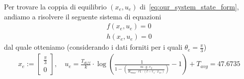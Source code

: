 \documentclass[a4paper, 11pt]{article}
\begin{document}
%
Per trovare la coppia di equilibrio $(x_e, u_e)$ di~\eqref{eq:our_system_state_form}, andiamo a risolvere il seguente sistema di equazioni
%
\begin{align}
	f(x_e,u_e) = 0  \\
	h(x_e,u_e) = 0 
\end{align}
%
dal quale otteniamo (considerando i dati forniti per i quali $\theta_e = \frac{\pi}{3}$)
%
\begin{align}
	x_e := 
        \begin{bmatrix}
	    \frac{\pi}{3} 
            \\
            0
	\end{bmatrix},  \quad u_e =  \frac{T_{diff}}{k} \cdot \log\left(\frac{1}{1 - \left(\frac{m \cdot g \cdot r_2}{K_{max} \cdot r1 \cdot (l - r_1 \cdot x_{1e})}\right)} - 1\right) + T_{avg}
 = 47.6735\label{eq:equilibirum_pair}
\end{align}
\end{document}

